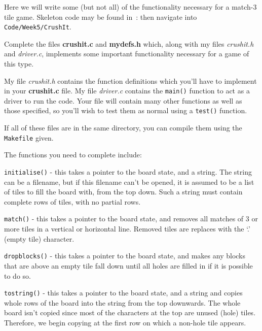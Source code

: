 \begin{exercise}

Here we will write some (but not all) of the functionality necessary
for a match-3 tile game.  Skeleton code may be found in~:
\noindent then navigate into \verb^Code/Week5/CrushIt^.

Complete the files {\bf crushit.c} and {\bf mydefs.h} which, along with
my files {\em crushit.h} and {\em driver.c}, implements some important
functionality necessary for a game of this type.

\noindent My file {\em crushit.h} contains the function definitions
which you'll have to implement in your {\bf crushit.c} file.  My file
{\em driver.c} contains the \verb^main()^ function to act as
a driver to run the code.  Your file will contain many other functions
as well as those specified, so you'll wish to test them as normal using
a \verb^test()^ function.

\noindent If all of these files are in the same directory, you can
compile them using the \verb^Makefile^ given.

\noindent The functions you need to complete include:

\verb^initialise()^ - this takes a pointer to the board state, and
a string.  The string can be a filename, but if this filename can't
be opened, it is assumed to be a list of tiles to fill the board with,
from the top down.  Such a string must contain complete rows of tiles,
with no partial rows.

\verb^match()^ - this takes a pointer to the board state, and removes
all matches of $3$ or more tiles in a vertical or horizontal line.
Removed tiles are replaces with the `.' (empty tile) character.

\verb^dropblocks()^ - this takes a pointer to the board state, and makes
any blocks that are above an empty tile fall down until all holes are
filled in if it is possible to do so.

\verb^tostring()^ - this takes a pointer to the board state, and a string
and copies whole rows of the board into the string from the top downwards.
The whole board isn't copied since most of the characters at the top
are unused (hole) tiles. Therefore, we begin copying at the first row
on which a non-hole tile appears.


\end{exercise}
